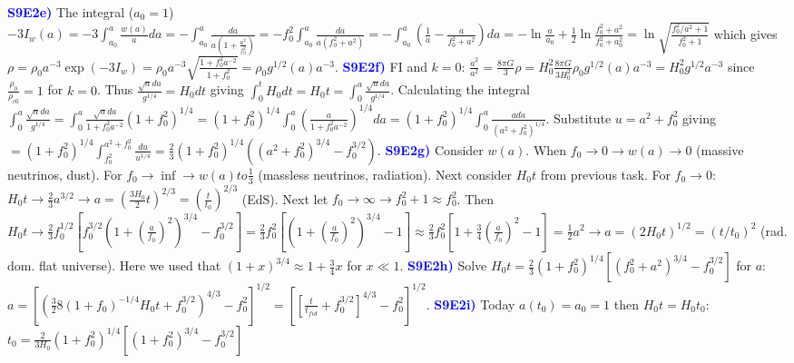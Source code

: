 \documentclass[landscape, a4paper,1pt,english]{article}
\begin{document}
{{{\begin{multicols}{5}
\textcolor{blue}{\textbf{S9E2e)}} The integral ($a_0=1$) $-3I_w(a) = -3\int_{a_0}^{a}\frac{w(a)}{a}da = -\int_{a_0}^{a}\frac{da}{a(1+\frac{a^2}{f_0^2})} = -f_0^2\int_{a_0}^{a}\frac{da}{a(f_0^2 + a^2)} = -\int_{a_0}^{a}(\frac{1}{a} - \frac{a}{f_0^2 + a^2} )da = -\ln\frac{a}{a_0} + \frac{1}{2}\ln\frac{f_0^2 + a^2}{f_0^2 + a_0^2} = \ln\sqrt{\frac{f_0^2/a^2 + 1}{f_0^2 + 1}}$ which gives $\rho = \rho_0 a^{-3}\exp(-3I_w) = \rho_0a^{-3}\sqrt{\frac{1 + f_0^2a^{-2}}{1 + f_0^2}} = \rho_0g^{1/2}(a)a^{-3}$.
\textcolor{blue}{\textbf{S9E2f)}} FI and $k=0$: $\frac{\dot{a}^2}{a^2} = \frac{8\pi G}{3}\rho = H_0^2 \frac{8\pi G}{3H_0^2}\rho_0 g^{1/2}(a)a^{-3} = H_0^2 g^{1/2}a^{-3}$ since $\frac{\rho_0}{\rho_{c0}} = 1$ for $k=0$. Thus $\frac{\sqrt{a}da}{g^{1/4}} = H_0 dt$ giving $\int_{0}^{t}H_0 dt = H_0 t = \int_{0}^{a}\frac{\sqrt{a}da}{g^{1/4}}$. Calculating the integral $\int_{0}^{a}\frac{\sqrt{a}da}{g^{1/4}}=\int_{0}^{a}\frac{\sqrt{a}da}{1+f_0^2a^{-2}}(1+f_0^2)^{1/4} = (1+f_0^2)^{1/4}\int_{0}^{a}\left(\frac{a}{1+f_0^2a^{-2}}\right)^{1/4}da = (1+f_0^2)^{1/4}\int_{0}^{a}\frac{ada}{(a^2 + f_0^2)^{1/4}}$. Substitute $u = a^2+f_0^2$  giving $= (1+f_0^2)^{1/4}\int_{f_0^2}^{a^2 + f_0^2}\frac{du}{u^{1/4}} = \frac{2}{3}(1+f_0^2)^{1/4}((a^2 + f_0^2)^{3/4} - f_0^{3/2})$.
\textcolor{blue}{\textbf{S9E2g)}} Consider $w(a)$. When $f_0\to0\rightarrow w(a)\to0$ (massive neutrinos, dust). For $f_0\to\inf\rightarrow w(a)to \frac{1}{3}$ (massless neutrinos, radiation). Next consider $H_0t$ from previous task. For $f_0\to 0$: $H_0t\to\frac{2}{3}a^{3/2}\rightarrow a = \left(\frac{3H_0}{2}t\right)^{2/3} = \left(\frac{t}{t_0}\right)^{2/3}$ (EdS). Next let $f_0\to\infty\rightarrow f_0^2 + 1\approx f_0^2$. Then $H_0t\to \frac{2}{3}f_0^{1/2}\left[f_0^{3/2}(1+\left(\frac{a}{f_0}\right)^2)^{3/4} - f_0^{3/2}\right] = \frac{2}{3}f_0^2\left[\left(1 + \left(\frac{a}{f_0}\right)^2\right)^{3/4} - 1\right] \approx \frac{2}{3}f_0^2\left[1 + \frac{3}{4}\left(\frac{a}{f_0}\right)^2 - 1\right] = \frac{1}{2}a^2\rightarrow a = (2H_0t)^{1/2} = (t/t_0)^2$ (rad. dom. flat universe). Here we used that $\left(1+x\right)^{3/4}\approx1+\frac{3}{4}x$ for $x\ll1$.
\textcolor{blue}{\textbf{S9E2h)}} Solve $H_0t = \frac{2}{3}(1+f_0^2)^{1/4}\left[\left(f_0^2 + a^2\right)^{3/4} - f_0^{3/2}\right]$ for $a$: $a = \left[\left(\frac{3}{2}8(1+f_0)^{-1/4}H_0t + f_0^{3/2}\right)^{4/3} - f_0^2\right]^{1/2} = \left[\left[\frac{t}{t_{fid}} + f_0^{3/2}\right]^{4/3} -f_0^2\right]^{1/2}$.
\textcolor{blue}{\textbf{S9E2i)}} Today $a(t_0) = a_0 = 1$ then $H_0t = H_0t_0$: $t_0 = \frac{2}{3H_0}(1+f_0^2)^{1/4}\left[(1+f_0^2)^{3/4} -f_0^{3/2}\right]$

\end{multicols}}}}
\end{document}
